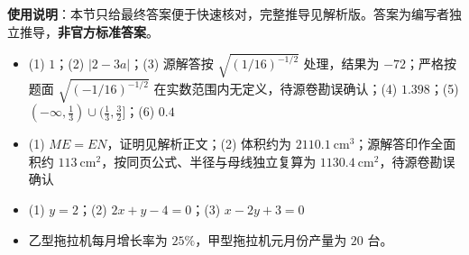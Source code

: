
\begin{gknotice}
\textbf{使用说明}：本节只给最终答案便于快速核对，完整推导见解析版。答案为编写者独立推导，\textbf{非官方标准答案}。
\end{gknotice}

\begin{itemize}[leftmargin=2.6em]
  \item[\textbf{1.}] (1) $1$；(2) $\lvert2-3a\rvert$；(3) 源解答按 $\sqrt{(1/16)^{-1/2}}$ 处理，结果为 $-72$；严格按题面 $\sqrt{(-1/16)^{-1/2}}$ 在实数范围内无定义，待源卷勘误确认；(4) $1.398$；(5) $(-\infty,\frac13)\cup(\frac13,\frac32]$；(6) $0.4$
  \item[\textbf{2.}] (1) $ME=EN$，证明见解析正文；(2) 体积约为 $2110.1\ \mathrm{cm^3}$；源解答印作全面积约 $113\ \mathrm{cm^2}$，按同页公式、半径与母线独立复算为 $1130.4\ \mathrm{cm^2}$，待源卷勘误确认
  \item[\textbf{3.}] (1) $y=2$；(2) $2x+y-4=0$；(3) $x-2y+3=0$
  \item[\textbf{4.}] 乙型拖拉机每月增长率为 $25\%$，甲型拖拉机元月份产量为 $20$ 台。
\end{itemize}
